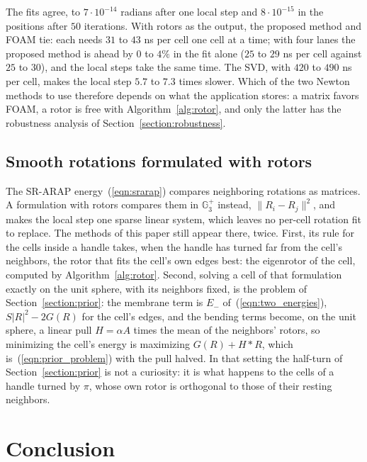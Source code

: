 \documentclass{birkjour}
\theoremstyle{definition}
\theoremstyle{remark}
\numberwithin{equation}{section}
\newcommand{\Ge}{\mathbb{G}}
\begin{document}
The fits agree, to $7 \cdot 10^{-14}$ radians after one local step and $8 \cdot 10^{-15}$ in the positions after $50$ iterations. With rotors as the output, the proposed method and FOAM tie: each needs $31$ to $43$ ns per cell one cell at a time; with four lanes the proposed method is ahead by $0$ to $4\%$ in the fit alone ($25$ to $29$ ns per cell against $25$ to $30$), and the local steps take the same time. The SVD, with $420$ to $490$ ns per cell, makes the local step $5.7$ to $7.3$ times slower. Which of the two Newton methods to use therefore depends on what the application stores: a matrix favors FOAM, a rotor is free with Algorithm~\ref{alg:rotor}, and only the latter has the robustness analysis of Section~\ref{section:robustness}.

\subsection{Smooth rotations formulated with rotors}

The SR-ARAP energy~(\ref{eqn:srarap}) compares neighboring rotations as matrices. A formulation with rotors \cite{LopezBelonSRARAP} compares them in $\Ge_3^+$ instead, $\|R_i - R_j\|^2$, and makes the local step one sparse linear system, which leaves no per-cell rotation fit to replace. The methods of this paper still appear there, twice. First, its rule for the cells inside a handle takes, when the handle has turned far from the cell's neighbors, the rotor that fits the cell's own edges best: the eigenrotor of the cell, computed by Algorithm~\ref{alg:rotor}. Second, solving a cell of that formulation exactly on the unit sphere, with its neighbors fixed, is the problem of Section~\ref{section:prior}: the membrane term is $E_-$ of~(\ref{eqn:two_energies}), $S |R|^2 - 2 G(R)$ for the cell's edges, and the bending terms become, on the unit sphere, a linear pull $H = \alpha A$ times the mean of the neighbors' rotors, so minimizing the cell's energy is maximizing $G(R) + H * R$, which is~(\ref{eqn:prior_problem}) with the pull halved. In that setting the half-turn of Section~\ref{section:prior} is not a curiosity: it is what happens to the cells of a handle turned by $\pi$, whose own rotor is orthogonal to those of their resting neighbors.

\section{Conclusion}
\end{document}
